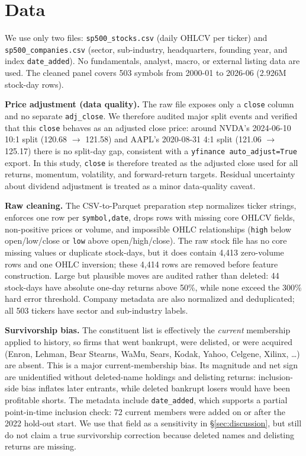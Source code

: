 \documentclass[9pt]{extarticle}
\begin{document}
\section{Data}

We use only two files: \texttt{sp500\_stocks.csv} (daily OHLCV per ticker) and
\texttt{sp500\_companies.csv} (sector, sub-industry, headquarters, founding year,
and index \texttt{date\_added}). No fundamentals, analyst, macro, or external
listing data are used. The cleaned panel covers 503 symbols from 2000-01 to
2026-06 (2.926M stock-day rows).

\textbf{Price adjustment (data quality).} The raw file exposes only a
\texttt{close} column and no separate \texttt{adj\_close}. We therefore audited
major split events and verified that this \texttt{close} behaves as an adjusted
close price: around NVDA's 2024-06-10 10:1 split (120.68 $\rightarrow$ 121.58)
and AAPL's 2020-08-31 4:1 split (121.06 $\rightarrow$ 125.17) there is no
split-day gap, consistent with a \texttt{yfinance auto\_adjust=True} export. In
this study, \texttt{close} is therefore treated as the adjusted close used for
all returns, momentum, volatility, and forward-return targets. Residual
uncertainty about dividend adjustment is treated as a minor data-quality caveat.

\textbf{Raw cleaning.} The CSV-to-Parquet preparation step normalizes ticker
strings, enforces one row per \texttt{symbol,date}, drops rows with missing core
OHLCV fields, non-positive prices or volume, and impossible OHLC relationships
(\texttt{high} below open/low/close or \texttt{low} above open/high/close). The
raw stock file has no core missing values or duplicate stock-days, but it does
contain 4,413 zero-volume rows and one OHLC inversion; these 4,414 rows are
removed before feature construction. Large but plausible moves are audited rather
than deleted: 44 stock-days have absolute one-day returns above 50\%, while none
exceed the 300\% hard error threshold. Company metadata are also normalized and
deduplicated; all 503 tickers have sector and sub-industry labels.

\textbf{Survivorship bias.} The constituent list is effectively the
\emph{current} membership applied to history, so firms that went bankrupt, were
delisted, or were acquired (Enron, Lehman, Bear Stearns, WaMu, Sears, Kodak,
Yahoo, Celgene, Xilinx, \dots) are absent. This is a major current-membership
bias. Its magnitude and net sign are unidentified without deleted-name holdings
and delisting returns: inclusion-side bias inflates later entrants, while
deleted bankrupt losers would have been profitable shorts. The metadata include \texttt{date\_added},
which supports a partial point-in-time inclusion check: 72 current members were
added on or after the 2022 hold-out start. We use that field as a sensitivity in
\S\ref{sec:discussion}, but still do not claim a true survivorship correction
because deleted names and delisting returns are missing.
\end{document}
